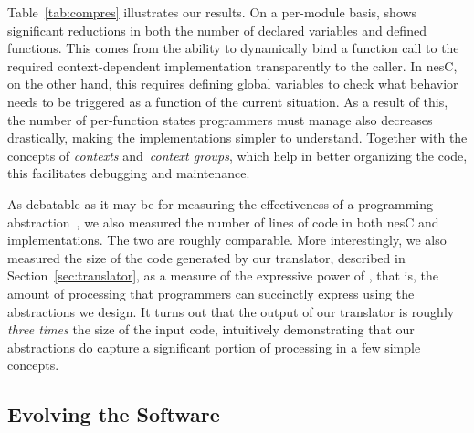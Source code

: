  Table~\ref{tab:compres} illustrates our
results. On a per-module basis, \conesc shows significant reductions
in both the number of declared variables and defined functions. This
comes from the ability to dynamically bind a function call to the
required context-dependent implementation transparently to the
caller. In nesC, on the other hand, this requires defining global
variables to check what behavior needs to be triggered as a function
of the current situation. As a result of this, the number of
per-function states programmers must manage also decreases
drastically, making the implementations simpler to
understand. Together with the concepts of \emph{contexts}
and~\emph{context groups}, which help in better organizing the code,
this facilitates debugging and maintenance.



As debatable as it may be for measuring the effectiveness of a
programming abstraction~\cite{mottolasurvey}, we also measured the
number of lines of code in both nesC and \conesc implementations. The
two are roughly comparable. More interestingly, we also measured the
size of the code generated by our translator, described in
Section~\ref{sec:translator}, as a measure of the expressive power of
\conesc, that is, the amount of processing that \conesc programmers
can succinctly express using the abstractions we design. It turns out
that the output of our translator is roughly \emph{three times} the
size of the input code, intuitively demonstrating that our
abstractions do capture a significant portion of processing in a few
simple concepts.

\subsection{Evolving the Software}\label{sec:evolve}

